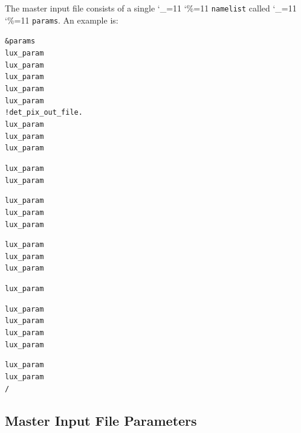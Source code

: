 \documentclass[11pt]{article}
\newcommand\ttcmd{\begingroup\catcode`\_=11 \catcode`\%=11 \dottcmd}  %
\newcommand\dottcmd[1]{\texttt{#1}\endgroup}
\newcommand{\vn}{\ttcmd}
\newenvironment{example}
  {\vspace{\ExBeg} \begin{alltt}}
  {\end{alltt} \vspace{\ExEnd}}
\newlength{\ExBeg}
\newlength{\ExEnd}
\begin{document}
The master input file consists of a single \vn{namelist} called \vn{params}.
An example is:
\begin{example}
  &params
    lux_param%
    lux_param%
    lux_param%
    lux_param%
    lux_param%
                                                 !             det_pix_out_file.
    lux_param%
    lux_param%
    lux_param%

    lux_param%
    lux_param%

    lux_param%
    lux_param%
    lux_param%

    lux_param%
    lux_param%
    lux_param%

    lux_param%

    lux_param%
    lux_param%
    lux_param%
    lux_param%

    lux_param%
    lux_param%
  /
\end{example}

\subsection{Master Input File Parameters}
\label{ss:master.params}
\end{document}
